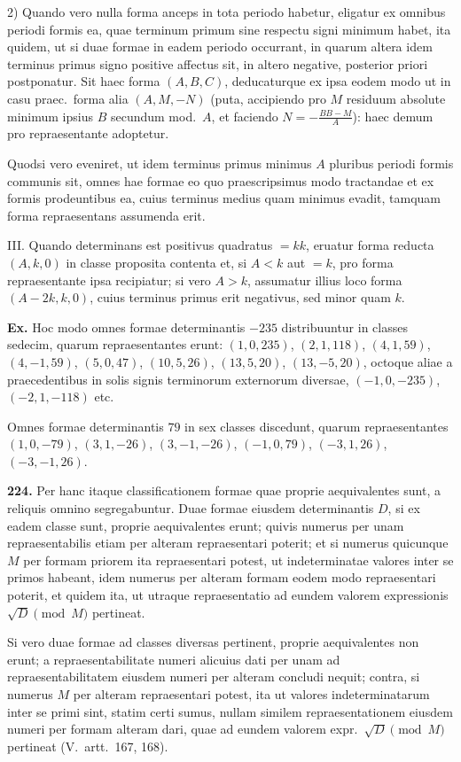 \documentclass[12pt,a4paper]{article}
\theoremstyle{plain}
\theoremstyle{definition}
\theoremstyle{remark}
\begin{document}
2) Quando vero nulla forma anceps in tota periodo habetur, eligatur ex omnibus periodi formis ea, quae terminum primum sine respectu signi minimum habet, ita quidem, ut si duae formae in eadem periodo occurrant, in quarum altera idem terminus primus signo positive affectus sit, in altero negative, posterior priori postponatur. Sit haec forma $(A,B,C)$, deducaturque ex ipsa eodem modo ut in casu praec.\ forma alia $(A,M,-N)$ (puta, accipiendo pro $M$ residuum absolute minimum ipsius $B$ secundum mod.\ $A$, et faciendo $N=-\frac{BB-M}{A}$): haec demum pro repraesentante adoptetur.

Quodsi vero eveniret, ut idem terminus primus minimus $A$ pluribus periodi formis communis sit, omnes hae formae eo quo praescripsimus modo tractandae et ex formis prodeuntibus ea, cuius terminus medius quam minimus evadit, tamquam forma repraesentans assumenda erit.

\textsc{III.} Quando determinans est positivus quadratus $=kk$, eruatur forma reducta $(A,k,0)$ in classe proposita contenta et, si $A<k$ aut $=k$, pro forma repraesentante ipsa recipiatur; si vero $A>k$, assumatur illius loco forma $(A-2k,k,0)$, cuius terminus primus erit negativus, sed minor quam $k$.

\textbf{Ex.} Hoc modo omnes formae determinantis $-235$ distribuuntur in classes sedecim, quarum repraesentantes erunt: $(1,0,235)$, $(2,1,118)$, $(4,1,59)$, $(4,-1,59)$, $(5,0,47)$, $(10,5,26)$, $(13,5,20)$, $(13,-5,20)$, octoque aliae a praecedentibus in solis signis terminorum externorum diversae, $(-1,0,-235)$, $(-2,1,-118)$ etc.

Omnes formae determinantis $79$ in sex classes discedunt, quarum repraesentantes $(1,0,-79)$, $(3,1,-26)$, $(3,-1,-26)$, $(-1,0,79)$, $(-3,1,26)$, $(-3,-1,26)$.

\textbf{224.}
Per hanc itaque classificationem formae quae proprie aequivalentes sunt, a reliquis omnino segregabuntur. Duae formae eiusdem determinantis $D$, si ex eadem classe sunt, proprie aequivalentes erunt; quivis numerus per unam repraesentabilis etiam per alteram repraesentari poterit; et si numerus quicunque $M$ per formam priorem ita repraesentari potest, ut indeterminatae valores inter se primos habeant, idem numerus per alteram formam eodem modo repraesentari poterit, et quidem ita, ut utraque repraesentatio ad eundem valorem expressionis $\sqrt{D}\pmod{M}$ pertineat.

Si vero duae formae ad classes diversas pertinent, proprie aequivalentes non erunt; a repraesentabilitate numeri alicuius dati per unam ad repraesentabilitatem eiusdem numeri per alteram concludi nequit; contra, si numerus $M$ per alteram repraesentari potest, ita ut valores indeterminatarum inter se primi sint, statim certi sumus, nullam similem repraesentationem eiusdem numeri per formam alteram dari, quae ad eundem valorem expr.\ $\sqrt{D}\pmod{M}$ pertineat (V.\ artt.~167, 168).
\end{document}
